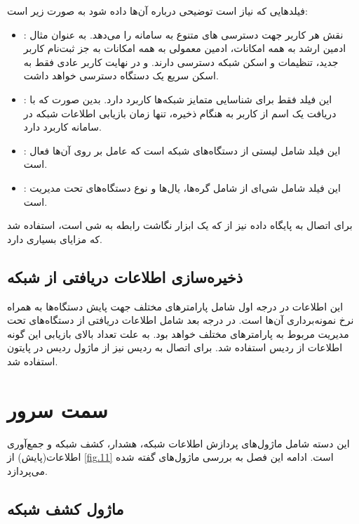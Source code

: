 فیلدهایی که نیاز است توضیحی درباره آن‌ها داده شود به صورت زیر است:

\begin{itemize}
    \item {}: نقش هر کاربر جهت دسترسی ‌های متنوع به سامانه را می‌دهد. به عنوان مثال ادمین ارشد به همه امکانات، ادمین معمولی به همه امکانات به جز ثبت‌نام کاربر جدید، تنظیمات و اسکن شبکه دسترسی دارند. و در نهایت کاربر عادی فقط به اسکن سریع یک دستگاه دسترسی خواهد داشت.
    \item {}: این فیلد فقط برای شناسایی متمایز شبکه‌ها کاربرد دارد. بدین صورت که با دریافت یک اسم از کاربر به هنگام ذخیره، تنها زمان بازیابی اطلاعات شبکه در سامانه کاربرد دارد.
    \item {}: این فیلد شامل لیستی از دستگاه‌های شبکه است که عامل  بر روی آن‌ها فعال است.
    \item {}: این فیلد شامل شی‌ای از  شامل گره‌ها، یال‌ها و نوع دستگاه‌های تحت مدیریت است.

\end{itemize}


برای اتصال به پایگاه داده  نیز از  که یک ابزار نگاشت رابطه به شی است، استفاده شد که مزایای بسیاری دارد.



\subsection{ذخیره‌سازی اطلاعات دریافتی از شبکه}

این اطلاعات در درجه اول شامل پارامتر‌های مختلف جهت پایش دستگاه‌ها به همراه نرخ نمونه‌برداری آن‌ها است. در درجه بعد شامل اطلاعات دریافتی از دستگاه‌های تحت مدیریت مربوط به پارامترهای مختلف خواهد بود. به علت تعداد بالای بازیابی این گونه اطلاعات از ردیس استفاده شد. برای اتصال به ردیس نیز از ماژول ردیس در پایتون استفاده شد.

\newpage

\section{سمت سرور}

این دسته شامل ماژول‌های پردازش اطلاعات شبکه، هشدار، کشف شبکه و جمع‌آوری اطلاعات(پایش) از \cref{fig.11} است. ادامه این فصل به بررسی ماژول‌های گفته شده می‌پردازد.


\subsection{ماژول کشف شبکه}

